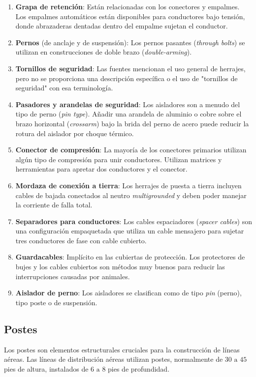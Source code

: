 \begin{enumerate}
    \item \textbf{Grapa de retención}: Están relacionadas con los conectores y empalmes. Los empalmes automáticos están disponibles para conductores bajo tensión, donde abrazaderas dentadas dentro del empalme sujetan el conductor.
    \item \textbf{Pernos} (de anclaje y de suspensión): Los pernos pasantes (\textit{through bolts}) se utilizan en construcciones de doble brazo (\textit{double-arming}).
    \item \textbf{Tornillos de seguridad}: Las fuentes mencionan el uso general de herrajes, pero no se proporciona una descripción específica o el uso de "tornillos de seguridad" con esa terminología.
    \item \textbf{Pasadores y arandelas de seguridad}: Los aisladores son a menudo del tipo de perno (\textit{pin type}). Añadir una arandela de aluminio o cobre sobre el brazo horizontal (\textit{crossarm}) bajo la brida del perno de acero puede reducir la rotura del aislador por choque térmico.
    \item \textbf{Conector de compresión}: La mayoría de los conectores primarios utilizan algún tipo de compresión para unir conductores. Utilizan matrices y herramientas para apretar dos conductores y el conector.
    \item \textbf{Mordaza de conexión a tierra}: Los herrajes de puesta a tierra incluyen cables de bajada conectados al neutro \textit{multigrounded} y deben poder manejar la corriente de falla total.
    \item \textbf{Separadores para conductores}: Los cables espaciadores (\textit{spacer cables}) son una configuración empaquetada que utiliza un cable mensajero para sujetar tres conductores de fase con cable cubierto.
    \item \textbf{Guardacables}: Implícito en las cubiertas de protección. Los protectores de bujes y los cables cubiertos son métodos muy buenos para reducir las interrupciones causadas por animales.
    \item \textbf{Aislador de perno}: Los aisladores se clasifican como de tipo \textit{pin} (perno), tipo poste o de suspensión.
\end{enumerate}

\subsection*{Postes}
Los postes son elementos estructurales cruciales para la construcción de líneas aéreas. Las líneas de distribución aéreas utilizan postes, normalmente de $30 \text{ a } 45$ pies de altura, instalados de $6 \text{ a } 8$ pies de profundidad.

